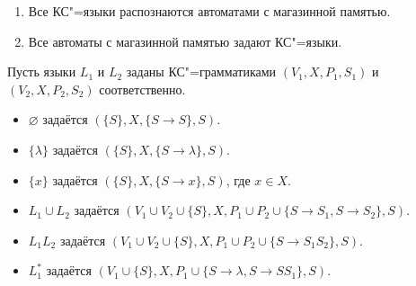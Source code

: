 \begin{theorem}
\begin{enumerate}
	\item Все КС"=языки распознаются автоматами с магазинной памятью.
	\item Все автоматы с магазинной памятью задают КС"=языки.
\end{enumerate}
\end{theorem}

Пусть языки $L_1$ и $L_2$ заданы КС"=грамматиками $(V_1, X, P_1, S_1)$ и $(V_2, X, P_2, S_2)$ соответственно.
\begin{itemize}
	\item $\varnothing$ задаётся $(\{ S \}, X, \{ S \to S \}, S)$.
	\item $\{ \lambda \}$ задаётся $(\{ S \}, X, \{ S \to \lambda \}, S)$.
	\item $\{ x \}$ задаётся $(\{ S \}, X, \{ S \to x \}, S)$, где $x \in X$.
	\item $L_1 \cup L_2$ задаётся $(V_1 \cup V_2 \cup \{ S \}, X, P_1 \cup P_2 \cup \{ S \to S_1, S \to S_2 \}, S)$.
	\item $L_1 L_2$ задаётся $(V_1 \cup V_2 \cup \{ S \}, X, P_1 \cup P_2 \cup \{ S \to S_1 S_2 \}, S)$.
	\item $L_1^*$ задаётся $(V_1 \cup \{ S \}, X, P_1 \cup \{ S \to \lambda, S \to S S_1 \}, S)$.
\end{itemize}
